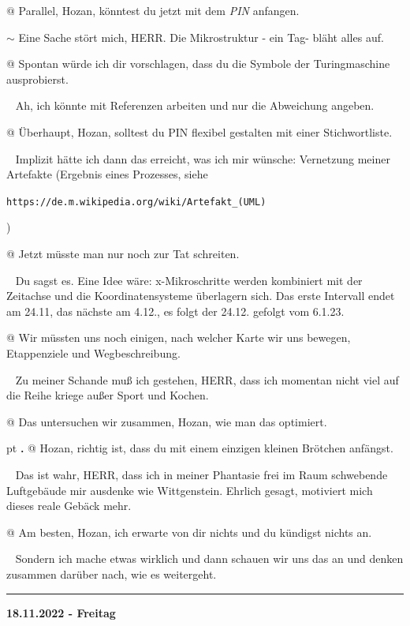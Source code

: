 \documentclass[10pt,a4paper]{article}
\newcounter{notec}
\newcommand\notep[1]{%
  \stepcounter{notec}
  \vskip #1pt
  {\bf\arabic{notec}.}
}
\newcommand\rele[1] {{\color {english} \bf {#1}}}              %
\newcommand\ddivide {\vskip -9pt \hrule \vskip 6pt}
\begin{document}
\begin{mdframed}[style=daystyle]
  \vskip 2pt
  $@$ Parallel, Hozan, könntest du jetzt mit dem {\it PIN} anfangen.

  \vskip 2pt
  $\sim$ Eine Sache stört mich, HERR. Die Mikrostruktur - ein Tag- bläht alles
  auf.

  \vskip 2pt
@ Spontan würde ich dir vorschlagen, dass du die Symbole der Turingmaschine ausprobierst.

  \vskip 2pt
~ Ah, ich könnte mit Referenzen arbeiten und nur die Abweichung angeben.

  \vskip 2pt
@ Überhaupt, Hozan, solltest du PIN flexibel gestalten mit einer Stichwortliste.

  \vskip 2pt
~ Implizit hätte ich dann das erreicht, was ich mir wünsche: Vernetzung meiner Artefakte (Ergebnis eines Prozesses, siehe

\verb+https://de.m.wikipedia.org/wiki/Artefakt_(UML)+

)

  \vskip 2pt
@ Jetzt müsste man nur noch zur Tat schreiten.

  \vskip 2pt
~ Du sagst es. Eine Idee wäre: x-Mikroschritte werden kombiniert mit der Zeitachse und die Koordinatensysteme überlagern sich. Das erste Intervall endet am 24.11, das nächste am 4.12., es folgt der 24.12. gefolgt vom 6.1.23.

  \vskip 2pt
@ Wir müssten uns noch einigen, nach welcher Karte wir uns bewegen, Etappenziele und Wegbeschreibung.

  \vskip 2pt
~ Zu meiner Schande muß ich gestehen, HERR, dass ich momentan nicht viel auf die Reihe kriege außer Sport und Kochen.

  \vskip 2pt
@ Das untersuchen wir zusammen, Hozan, wie man das optimiert.

\notep 4 @ Hozan, richtig ist, dass du mit einem einzigen kleinen Brötchen anfängst.

  \vskip 2pt
~ Das ist wahr, HERR, dass ich in meiner Phantasie frei im Raum schwebende Luftgebäude mir ausdenke wie Wittgenstein. Ehrlich gesagt, motiviert mich dieses reale Gebäck mehr.

  \vskip 2pt
@ Am besten, Hozan, ich erwarte von dir nichts und du kündigst nichts an.

  \vskip 2pt
~ Sondern ich mache etwas wirklich und dann schauen wir uns das an und denken zusammen darüber nach, wie es weitergeht.

\end{mdframed}


\ddivide
{\rele {18.11.2022 - Freitag}}
\end{document}

